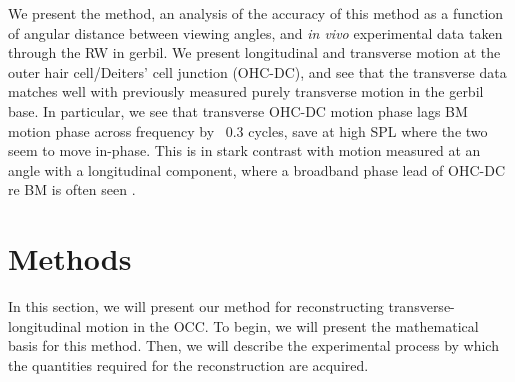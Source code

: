 \documentclass[preprint,NumberedRefs]{JASA}
\begin{document}
\par{We present the method, an analysis of the accuracy of this method as a function of angular distance between viewing angles, and \textit{in vivo} experimental data taken through the RW in gerbil. We present longitudinal and transverse motion at the outer hair cell/Deiters' cell junction (OHC-DC), and see that the transverse data matches well with previously measured purely transverse motion in the gerbil base. In particular, we see that transverse OHC-DC motion phase lags BM motion phase across frequency by ~0.3 cycles, save at high SPL where the two seem to move in-phase. This is in stark contrast with motion measured at an angle with a longitudinal component, where a broadband phase lead of OHC-DC re BM is often seen \citep{frost2022}.}

\section{Methods}
\par{In this section, we will present our method for reconstructing transverse-longitudinal motion in the OCC. To begin, we will present the mathematical basis for this method. Then, we will describe the experimental process by which the quantities required for the reconstruction are acquired.}
\end{document}
